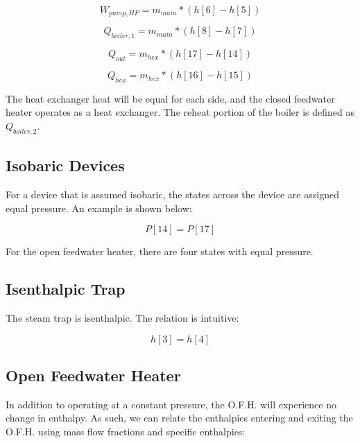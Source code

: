 \documentclass[10pt,cleanfoot]{asme2ej}
\begin{document}
\begin{equation}
W_{pump,HP} = m_{main} * (h[6] - h[5])
\label{Pump work in}
\end{equation}

\begin{equation}
Q_{boiler,1} = m_{main} * (h[8] - h[7])
\label{Boiler heat in}
\end{equation}

\begin{equation}
Q_{out} = m_{hex} * (h[17] - h[14])
\label{Condenser heat out}
\end{equation}

\begin{equation}
Q_{hex} = m_{hex} * (h[16] - h[15])
\label{Heat across exchangers}
\end{equation}

The heat exchanger heat will be equal for each side, and the closed feedwater heater operates as a heat exchanger. The reheat portion of the boiler is defined as $Q_{boiler,2}$.

\subsection{Isobaric Devices}

For a device that is assumed isobaric, the states across the device are assigned equal pressure. An example is shown below:

\begin{equation}
P[14] = P[17]
\label{Isobaric device}
\end{equation}

For the open feedwater heater, there are four states with equal pressure.

\subsection{Isenthalpic Trap}

The steam trap is isenthalpic. The relation is intuitive:

\begin{equation}
h[3] = h[4]
\label{Isobaric device}
\end{equation}

\subsection{Open Feedwater Heater}

In addition to operating at a constant pressure, the O.F.H. will experience no change in enthalpy. As such, we can relate the enthalpies entering and exiting the O.F.H. using mass flow fractions and specific enthalpies:
\end{document}
